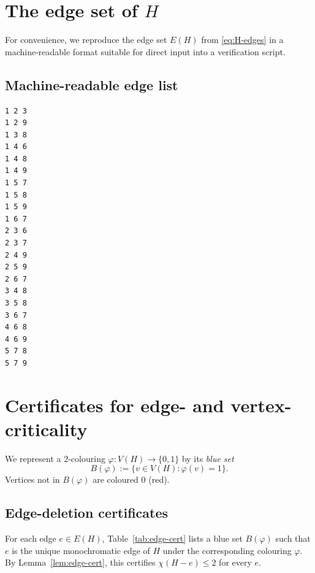 \documentclass[11pt]{amsart}
\theoremstyle{definition}
\theoremstyle{remark}
\newcommand{\V}{V}
\newcommand{\E}{E}
\begin{document}
\clearpage
\appendix

\section{The edge set of \texorpdfstring{$H$}{H}}\label{app:edges}

For convenience, we reproduce the edge set $\E(H)$ from \eqref{eq:H-edges} in a machine-readable format suitable for direct input into a verification script.

\subsection*{Machine-readable edge list}

\begin{lstlisting}
1 2 3
1 2 9
1 3 8
1 4 6
1 4 8
1 4 9
1 5 7
1 5 8
1 5 9
1 6 7
2 3 6
2 3 7
2 4 9
2 5 9
2 6 7
3 4 8
3 5 8
3 6 7
4 6 8
4 6 9
5 7 8
5 7 9
\end{lstlisting}

\section{Certificates for edge- and vertex-criticality}\label{app:certificates}

We represent a $2$-colouring $\varphi:\V(H)\to\{0,1\}$ by its \emph{blue set}
\[
B(\varphi):=\{v\in \V(H): \varphi(v)=1\}.
\]
Vertices not in $B(\varphi)$ are coloured $0$ (red).

\subsection{Edge-deletion certificates}

For each edge $e\in \E(H)$, Table~\ref{tab:edge-cert} lists a blue set $B(\varphi)$ such that $e$ is the unique monochromatic edge of $H$ under the corresponding colouring $\varphi$.
By Lemma~\ref{lem:edge-cert}, this certifies $\chi(H-e)\le 2$ for every $e$.
\end{document}

